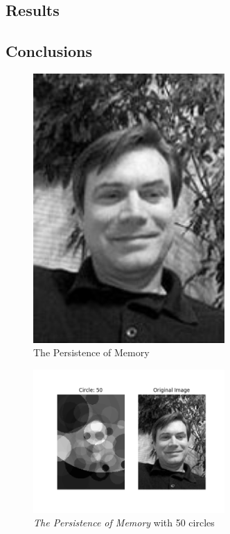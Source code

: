 \documentclass[12pt]{article}
\begin{document}
\subsection{Results}

\subsection{Conclusions}

\begin{figure}[H]
\centering
\noindent\includegraphics[width=0.65\textwidth]{../images/jmcgough}
\caption{The Persistence of Memory}
\label{fig:jmcgough}
\end{figure}

\begin{figure}[H]
\centering
\noindent\includegraphics[width=0.65\textwidth]{../results/jmcgough/jmcgough_0050.png}
\caption{\textit{The Persistence of Memory} with 50 circles}
\label{fig:jmcgough_0050}
\end{figure}
\end{document}
